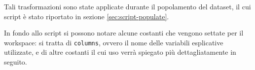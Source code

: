 Tali trasformazioni sono state applicate durante il popolamento del dataset, il
cui script è stato riportato in sezione \ref{sec:script-populate}.

In fondo allo script si possono notare alcune costanti che vengono settate per
il workspace: si tratta di \texttt{columns}, ovvero il nome delle variabili
esplicative utilizzate, e di altre costanti il cui uso verrà spiegato più
dettagliatamente in seguito.

